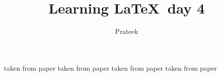 \documentclass[a4paper,12pt]{IEEEtran}%
\title{Learning \LaTeX\ day 4}
\author{Prateek}
\begin{document}

taken from paper \cite{p1}
taken from paper \cite{p3}
taken from paper \cite{p1}
taken from paper \cite{p2}

\Blindtext

\end{document}

